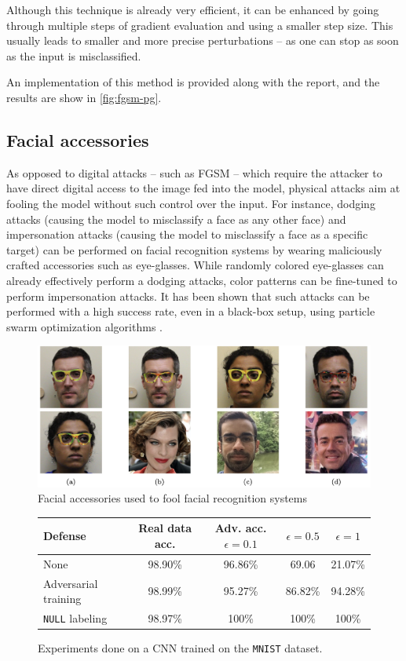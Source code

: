 \documentclass[twocolumn]{../cs-classes/cs-classes}
\begin{document}
Although this technique is already very efficient, it can be enhanced by going through multiple steps of gradient evaluation and using a smaller step size. This usually leads to smaller and more precise perturbations -- as one can stop as soon as the input is misclassified.

An implementation of this method is provided along with the report, and the results are show in \autoref{fig:fgsm-pg}.

\subsection{Facial accessories}
As opposed to digital attacks -- such as FGSM -- which require the attacker to have direct digital access to the image fed into the model, physical attacks \cite{kurakin2018adversarial} aim at fooling the model without such control over the input. For instance, dodging attacks (causing the model to misclassify a face as any other face) and impersonation attacks (causing the model to misclassify a face as a specific target) can be performed on facial recognition systems by wearing maliciously crafted accessories such as eye-glasses. While randomly colored eye-glasses can already effectively perform a dodging attacks, color patterns can be fine-tuned to perform impersonation attacks. It has been shown that such attacks can be performed with a high success rate, even in a black-box setup, using particle swarm optimization algorithms \cite{sharif2016accessorize}.
\begin{figure}[H]
    \centering
    \includegraphics[width=\linewidth]{facial-accessories.png}
    \caption{Facial accessories used to fool facial recognition systems \cite{sharif2016accessorize}}
\end{figure}


\begin{figure}
    \centering
    \renewcommand{\arraystretch}{1.2}
    \begin{tabular}{|p{3.7cm}||c|c|c|c|}
      \hline
      \centering Defense & Real data acc. & Adv. acc. $\epsilon=0.1$ & $\epsilon=0.5$ & $\epsilon=1$\\
      \hline\hline
      None & 98.90\% & 96.86\% & 69.06 & 21.07\%\\\hline
      Adversarial training & 98.99\% & 95.27\% & 86.82\% & 94.28\%\\\hline
      \texttt{NULL} labeling & 98.97\% & 100\% & 100\% & 100\% \\\hline
    \end{tabular}
  \caption{Experiments done on a CNN trained on the \texttt{MNIST} dataset.}
  \label{fig:defense-comparison}
\end{figure}
\end{document}
